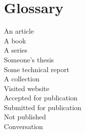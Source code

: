 \documentclass[letterpaper,12pt]{report}
\begin{document}
\section*{Glossary}

\clearpage

\setcounter{page}{1}

\clearpage
{}\clearpage
{}\clearpage
{}\clearpage
{}\clearpage

An article \cite{anarticle}\\
A book \cite{abook}\\
A series \cite{bookseries}\\
Someone's thesis \cite{thesis}\\
Some technical report \cite{report}\\
A collection \cite{collection}\\
Visited website \cite{website}\\
Accepted for publication \cite{acceptedpub}\\
Submitted for publication \cite{unpub}\\
Not published \cite{notpub}\\
Conversation \cite{conv}





\clearpage
\end{document}
